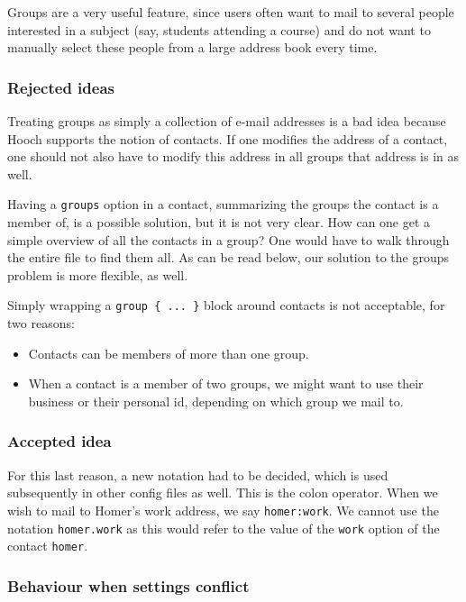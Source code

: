 \documentclass[a4paper]{article}
\begin{document}
Groups are a very useful feature, since users often want to mail to
several people interested in a subject (say, students attending a
course) and do not want to manually select these people from a large
address book every time.

\subsubsection{Rejected ideas}

Treating groups as simply a collection of e-mail addresses is a bad idea
because Hooch supports the notion of contacts.  If one modifies the
address of a contact, one should not also have to modify this address in
all groups that address is in as well.

Having a \texttt{groups} option in a contact, summarizing the groups the
contact is a member of, is a possible solution, but it is not very
clear.  How can one get a simple overview of all the contacts in a
group?  One would have to walk through the entire file to find them all.
As can be read below, our solution to the groups problem is more
flexible, as well.

Simply wrapping a \verb=group { ... }= block around contacts is not
acceptable, for two reasons:

\begin{itemize}
\item Contacts can be members of more than one group.
\item When a contact is a member of two groups, we might want to use
      their business or their personal id, depending on which group we
      mail to.
\end{itemize}

\subsubsection{Accepted idea}

For this last reason, a new notation had to be decided, which is used
subsequently in other config files as well.  This is the colon operator.
When we wish to mail to Homer's work address, we say
\texttt{homer:work}.  We cannot use the notation \texttt{homer.work} as
this would refer to the value of the \texttt{work} option of
the contact \texttt{homer}.

\subsubsection{Behaviour when settings conflict}
\end{document}
